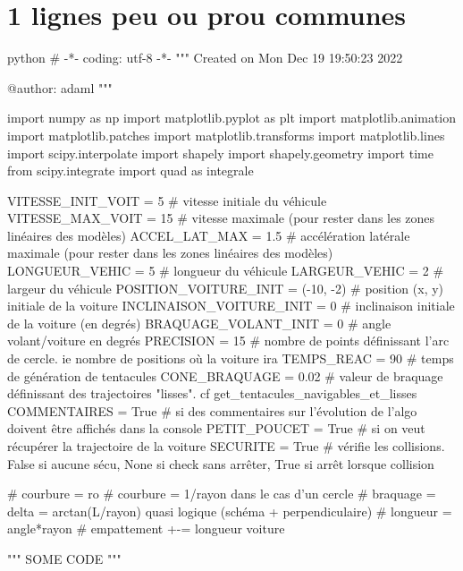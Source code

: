 \chapter{1 lignes peu ou prou communes}
\begin{mintedbox}{python}
# -*- coding: utf-8 -*-
"""
Created on Mon Dec 19 19:50:23 2022

@author: adaml
"""


import numpy as np
import matplotlib.pyplot as plt
import matplotlib.animation
import matplotlib.patches
import matplotlib.transforms
import matplotlib.lines
import scipy.interpolate
import shapely
import shapely.geometry
import time
from scipy.integrate import quad as integrale


VITESSE_INIT_VOIT = 5  # vitesse initiale du véhicule
VITESSE_MAX_VOIT = 15  # vitesse maximale (pour rester dans les zones linéaires des modèles)
ACCEL_LAT_MAX = 1.5  # accélération latérale maximale (pour rester dans les zones linéaires des modèles)
LONGUEUR_VEHIC = 5  # longueur du véhicule
LARGEUR_VEHIC = 2  # largeur du véhicule
POSITION_VOITURE_INIT = (-10, -2)  # position (x, y) initiale de la voiture
INCLINAISON_VOITURE_INIT = 0  # inclinaison initiale de la voiture (en degrés)
BRAQUAGE_VOLANT_INIT = 0  # angle volant/voiture en degrés
PRECISION = 15  # nombre de points définissant l'arc de cercle. ie nombre de positions où la voiture ira
TEMPS_REAC = 90  # temps de génération de tentacules
CONE_BRAQUAGE = 0.02  # valeur de braquage définissant des trajectoires "lisses". cf get_tentacules_navigables_et_lisses
COMMENTAIRES = True  # si des commentaires sur l'évolution de l'algo doivent être affichés dans la console
PETIT_POUCET = True  # si on veut récupérer la trajectoire de la voiture
SECURITE = True  # vérifie les collisions. False si aucune sécu, None si check sans arrêter, True si arrêt lorsque collision

# courbure = ro
# courbure = 1/rayon dans le cas d'un cercle
# braquage = delta = arctan(L/rayon) quasi logique (schéma + perpendiculaire)
# longueur = angle*rayon
# empattement +-= longueur voiture


"""
SOME CODE
"""

\end{mintedbox}
